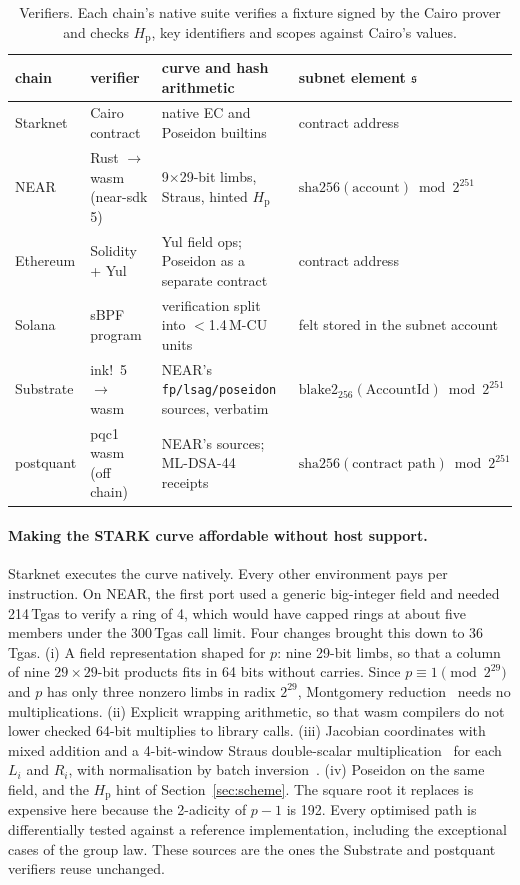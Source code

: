 \documentclass[11pt]{article}
\theoremstyle{remark}
\newcommand{\Hp}{H_{\mathrm{p}}}
\begin{document}
\begin{table}[t]
\centering\small
\begin{tabular}{@{}llll@{}}
\toprule
chain & verifier & curve and hash arithmetic & subnet element $\mathfrak{s}$ \\
\midrule
Starknet & Cairo contract & native EC and Poseidon builtins & contract address \\
NEAR & Rust $\to$ wasm (near-sdk 5) & 9$\times$29-bit limbs, Straus, hinted $\Hp$ & $\mathrm{sha256}(\text{account})\bmod 2^{251}$ \\
Ethereum & Solidity + Yul & Yul field ops; Poseidon as a separate contract & contract address \\
Solana & sBPF program & verification split into $<$1.4\,M-CU units & felt stored in the subnet account \\
Substrate & ink!~5 $\to$ wasm & NEAR's \texttt{fp/lsag/poseidon} sources, verbatim & $\mathrm{blake2}_{256}(\text{AccountId})\bmod 2^{251}$ \\
postquant & pqc1 wasm (off chain) & NEAR's sources; ML-DSA-44 receipts & $\mathrm{sha256}(\text{contract path})\bmod 2^{251}$ \\
\bottomrule
\end{tabular}
\caption{Verifiers. Each chain's native suite verifies a fixture signed by the Cairo prover and checks $\Hp$, key identifiers and scopes against Cairo's values.}
\label{tab:impl}
\end{table}

\paragraph{Making the STARK curve affordable without host support.} Starknet executes the curve natively. Every other environment pays per instruction. On NEAR, the first port used a generic big-integer field and needed 214\,Tgas to verify a ring of 4, which would have capped rings at about five members under the 300\,Tgas call limit. Four changes brought this down to 36\,Tgas. (i) A field representation shaped for $p$: nine 29-bit limbs, so that a column of nine $29\times29$-bit products fits in 64 bits without carries. Since $p\equiv 1 \pmod{2^{29}}$ and $p$ has only three nonzero limbs in radix $2^{29}$, Montgomery reduction~\cite{montgomery85} needs no multiplications. (ii) Explicit wrapping arithmetic, so that wasm compilers do not lower checked 64-bit multiplies to library calls. (iii) Jacobian coordinates with mixed addition and a 4-bit-window Straus double-scalar multiplication~\cite{straus64} for each $L_i$ and $R_i$, with normalisation by batch inversion~\cite{montgomery87}. (iv) Poseidon on the same field, and the $\Hp$ hint of Section~\ref{sec:scheme}. The square root it replaces is expensive here because the 2-adicity of $p-1$ is 192. Every optimised path is differentially tested against a reference implementation, including the exceptional cases of the group law. These sources are the ones the Substrate and postquant verifiers reuse unchanged.
\end{document}
